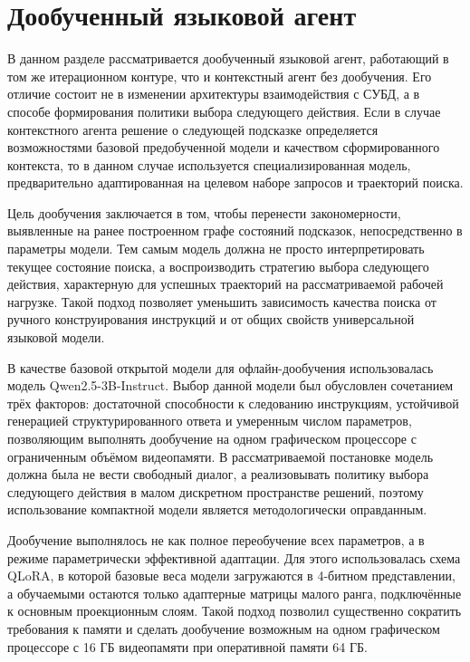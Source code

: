 \section{Дообученный языковой агент}\label{sec:ch4_finetuned}

В данном разделе рассматривается дообученный языковой агент, работающий в том же итерационном контуре, что и контекстный агент без дообучения. Его отличие состоит не в изменении архитектуры взаимодействия с СУБД, а в способе формирования политики выбора следующего действия. Если в случае контекстного агента решение о следующей подсказке определяется возможностями базовой предобученной модели и качеством сформированного контекста, то в данном случае используется специализированная модель, предварительно адаптированная на целевом наборе запросов и траекторий поиска.

Цель дообучения заключается в том, чтобы перенести закономерности, выявленные на ранее построенном графе состояний подсказок, непосредственно в параметры модели. Тем самым модель должна не просто интерпретировать текущее состояние поиска, а воспроизводить стратегию выбора следующего действия, характерную для успешных траекторий на рассматриваемой рабочей нагрузке. Такой подход позволяет уменьшить зависимость качества поиска от ручного конструирования инструкций и от общих свойств универсальной языковой модели.

В качестве базовой открытой модели для офлайн-дообучения использовалась модель Qwen2.5-3B-Instruct. Выбор данной модели был обусловлен сочетанием трёх факторов: достаточной способности к следованию инструкциям, устойчивой генерацией структурированного ответа и умеренным числом параметров, позволяющим выполнять дообучение на одном графическом процессоре с ограниченным объёмом видеопамяти. В рассматриваемой постановке модель должна была не вести свободный диалог, а реализовывать политику выбора следующего действия в малом дискретном пространстве решений, поэтому использование компактной модели является методологически оправданным.

Дообучение выполнялось не как полное переобучение всех параметров, а в режиме параметрически эффективной адаптации. Для этого использовалась схема QLoRA, в которой базовые веса модели загружаются в 4-битном представлении, а обучаемыми остаются только адаптерные матрицы малого ранга, подключённые к основным проекционным слоям. Такой подход позволил существенно сократить требования к памяти и сделать дообучение возможным на одном графическом процессоре с 16 ГБ видеопамяти при оперативной памяти 64 ГБ.

